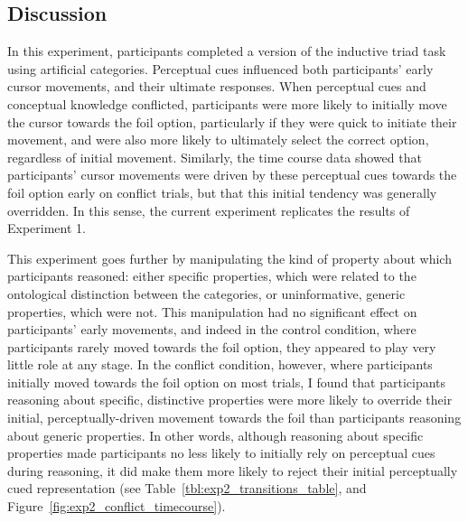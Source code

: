 

\subsection{Discussion}

In this experiment, participants completed 
a version of the inductive triad task using artificial categories.
Perceptual cues influenced both
participants' early cursor movements,
and their ultimate responses.
When perceptual cues and conceptual knowledge conflicted,
participants were more likely to initially move the cursor towards the foil option,
particularly if they were quick to initiate their movement,
and were also more likely to ultimately select the correct option,
regardless of initial movement.
Similarly, the time course data showed that
participants' cursor movements were driven by these perceptual cues
towards the foil option early on conflict trials,
but that this initial tendency was generally overridden.
In this sense, the current experiment
replicates the results of Experiment 1.

This experiment goes further by manipulating the kind of property
about which participants reasoned:
either specific properties, which were related to
the ontological distinction between the categories,
or uninformative, generic properties, which were not.
This manipulation had no significant effect
on participants' early movements,
and indeed in the control condition,
where participants rarely moved towards the foil option,
they appeared to play very little role at any stage.
In the conflict condition, however, where participants
initially moved towards the foil option on most trials,
I found that participants reasoning about specific, distinctive properties
were more likely to override their initial, perceptually-driven movement towards the foil
than participants reasoning about generic properties.
In other words, although reasoning about specific properties
made participants no less likely to initially rely on perceptual cues during reasoning,
it did make them more likely to reject their initial perceptually cued representation
(see Table~\ref{tbl:exp2_transitions_table}, and Figure~\ref{fig:exp2_conflict_timecourse}).

